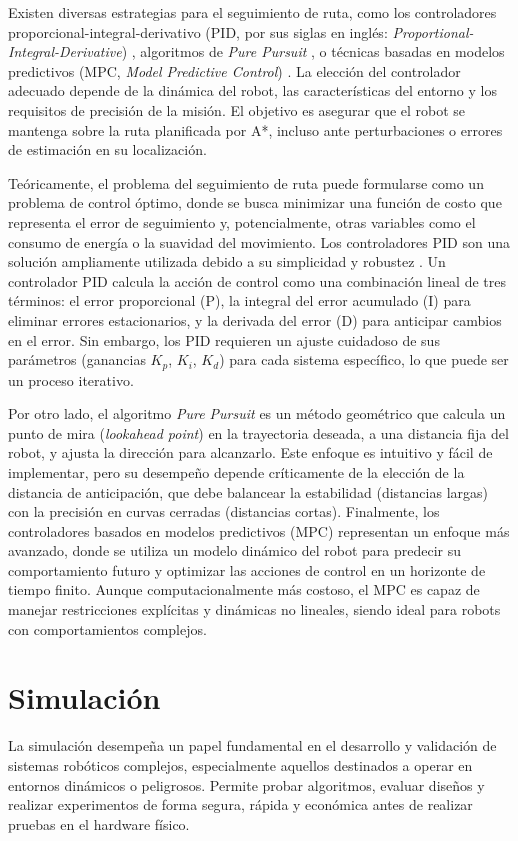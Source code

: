 Existen diversas estrategias para el seguimiento de ruta, como los controladores proporcional-integral-derivativo (PID, por sus siglas en inglés: \textit{Proportional-Integral-Derivative}) \citep{astrom2006pid}, algoritmos de \textit{Pure Pursuit} \citep{coulter1992pure}, o técnicas basadas en modelos predictivos (MPC, \textit{Model Predictive Control}) \citep{rawlings2017mpc}. La elección del controlador adecuado depende de la dinámica del robot, las características del entorno y los requisitos de precisión de la misión. El objetivo es asegurar que el robot se mantenga sobre la ruta planificada por A*, incluso ante perturbaciones o errores de estimación en su localización.

Teóricamente, el problema del seguimiento de ruta puede formularse como un problema de control óptimo, donde se busca minimizar una función de costo que representa el error de seguimiento y, potencialmente, otras variables como el consumo de energía o la suavidad del movimiento. Los controladores PID son una solución ampliamente utilizada debido a su simplicidad y robustez \citep{astrom2006pid}. Un controlador PID calcula la acción de control como una combinación lineal de tres términos: el error proporcional (P), la integral del error acumulado (I) para eliminar errores estacionarios, y la derivada del error (D) para anticipar cambios en el error. Sin embargo, los PID requieren un ajuste cuidadoso de sus parámetros (ganancias $K_p$, $K_i$, $K_d$) para cada sistema específico, lo que puede ser un proceso iterativo.

Por otro lado, el algoritmo \textit{Pure Pursuit} \citep{coulter1992pure} es un método geométrico que calcula un punto de mira (\textit{lookahead point}) en la trayectoria deseada, a una distancia fija del robot, y ajusta la dirección para alcanzarlo. Este enfoque es intuitivo y fácil de implementar, pero su desempeño depende críticamente de la elección de la distancia de anticipación, que debe balancear la estabilidad (distancias largas) con la precisión en curvas cerradas (distancias cortas). Finalmente, los controladores basados en modelos predictivos (MPC) \citep{rawlings2017mpc} representan un enfoque más avanzado, donde se utiliza un modelo dinámico del robot para predecir su comportamiento futuro y optimizar las acciones de control en un horizonte de tiempo finito. Aunque computacionalmente más costoso, el MPC es capaz de manejar restricciones explícitas y dinámicas no lineales, siendo ideal para robots con comportamientos complejos.

\section{Simulación}
La simulación desempeña un papel fundamental en el desarrollo y validación de sistemas robóticos complejos, especialmente aquellos destinados a operar en entornos dinámicos o peligrosos. Permite probar algoritmos, evaluar diseños y realizar experimentos de forma segura, rápida y económica antes de realizar pruebas en el hardware físico.

